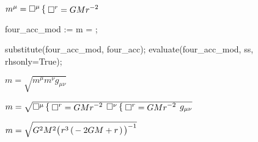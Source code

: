 \documentclass[10pt]{article}
\newcommand\brwrap[3]{%
  \setbox0=\hbox{$#2$}
  \left#1\vbox to \the\ht0{\hbox to 0pt{}}\right.\kern-.2em
  \begingroup #2\endgroup\kern-.15em
  \left.\vbox to \the\ht0{\hbox to 0pt{}}\right#3
}
\begin{document}
\begin{adjustwidth}{1em}{0cm}${}m^{\mu} = \square{}^{\mu}\brwrap{\{}{\begin{aligned}\square{}^{r}& = G M {r}^{-2}\\[-.5ex]
\end{aligned}}{.}
$\end{adjustwidth}
\begin{python}
four_acc_mod := m = ;

substitute(four_acc_mod, four_acc);
evaluate(four_acc_mod, ss, rhsonly=True);
\end{python}
\begin{adjustwidth}{1em}{0cm}${}m = \sqrt{m^{\mu} m^{\nu} g_{\mu \nu}}$\end{adjustwidth}
\begin{adjustwidth}{1em}{0cm}${}m = \sqrt{\square{}^{\mu}\brwrap{\{}{\begin{aligned}\square{}^{r}& = G M {r}^{-2}\\[-.5ex]
\end{aligned}}{.}
 \square{}^{\nu}\brwrap{\{}{\begin{aligned}\square{}^{r}& = G M {r}^{-2}\\[-.5ex]
\end{aligned}}{.}
 g_{\mu \nu}}$\end{adjustwidth}
\begin{adjustwidth}{1em}{0cm}${}m = \sqrt{{G}^{2} {M}^{2} {\brwrap{(}{{r}^{3} \brwrap{(}{-2G M+r}{)}}{)}}^{-1}}$\end{adjustwidth}
\begin{python}
\end{python}
\end{document}
